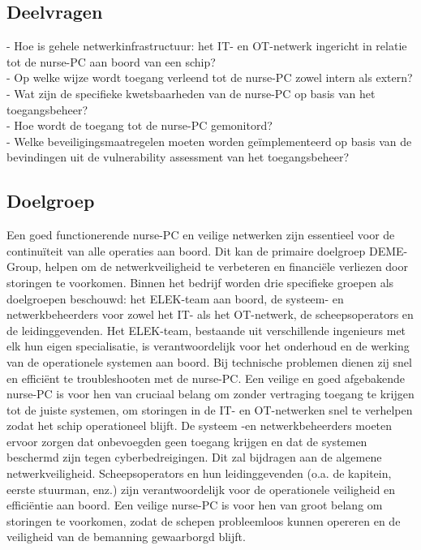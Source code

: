 \subsection{Deelvragen}
- Hoe is gehele netwerkinfrastructuur: het IT-  en OT-netwerk ingericht in relatie tot de nurse-PC aan boord van een schip? \\     
- Op welke wijze wordt toegang verleend tot de nurse-PC zowel intern als extern? \\    
- Wat zijn de specifieke kwetsbaarheden van de nurse-PC op basis van het toegangsbeheer? \\      
- Hoe wordt de toegang tot de nurse-PC gemonitord?  \\   
- Welke beveiligingsmaatregelen moeten worden geïmplementeerd op basis van de bevindingen uit de vulnerability assessment van het toegangsbeheer? \\

\subsection{Doelgroep}
Een goed functionerende nurse-PC en veilige netwerken zijn essentieel voor de continuïteit van alle operaties aan boord. 
Dit kan de primaire doelgroep DEME-Group, helpen om de netwerkveiligheid te verbeteren en financiële verliezen door storingen te voorkomen.
Binnen het bedrijf worden drie specifieke groepen als doelgroepen beschouwd: het ELEK-team aan boord, de systeem- en netwerkbeheerders voor zowel het IT- als het OT-netwerk, de scheepsoperators en de leidinggevenden.
Het ELEK-team, bestaande uit verschillende ingenieurs met elk hun eigen specialisatie, is verantwoordelijk voor het onderhoud en de werking van de operationele systemen aan boord. Bij technische problemen dienen zij snel en efficiënt te troubleshooten met de nurse-PC.  
Een veilige en goed afgebakende nurse-PC is voor hen van cruciaal belang om zonder vertraging toegang te krijgen tot de juiste systemen, om storingen in de IT- en OT-netwerken snel te verhelpen zodat het schip operationeel blijft.
De systeem -en netwerkbeheerders moeten ervoor zorgen dat onbevoegden geen toegang krijgen en dat de systemen beschermd zijn tegen cyberbedreigingen. Dit zal bijdragen aan de algemene netwerkveiligheid.
Scheepsoperators en hun leidinggevenden (o.a. de kapitein, eerste stuurman, enz.) zijn verantwoordelijk voor de operationele veiligheid en efficiëntie aan boord. Een veilige nurse-PC is voor hen van groot belang om storingen te voorkomen, 
zodat de schepen probleemloos kunnen opereren en de veiligheid van de bemanning gewaarborgd blijft.


